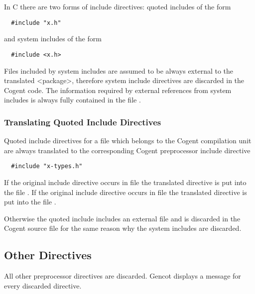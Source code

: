 In C there are two forms of include directives: quoted includes of the form
\begin{verbatim}
  #include "x.h"
\end{verbatim}
and system includes of the form
\begin{verbatim}
  #include <x.h>
\end{verbatim}
Files included by system includes are assumed to be always external to the translated <package>, therefore system
include directives are discarded in the Cogent code. The information required by external references from system 
includes is always fully contained in the file .

\subsubsection{Translating Quoted Include Directives}

Quoted include directives for a file  which belongs to the Cogent compilation unit are always translated 
to the corresponding Cogent preprocessor include directive
\begin{verbatim}
  #include "x-types.h"
\end{verbatim}
If the original include directive occurs in file  the translated directive is put into the file 
. If the original include directive occurs in file  the translated directive is put into the file
. 

Otherwise the quoted include includes an external file and is discarded in the Cogent source file for the same reason
why the system includes are discarded.

\subsection{Other Directives}

All other preprocessor directives are discarded. Gencot displays a message for every discarded directive.

 

